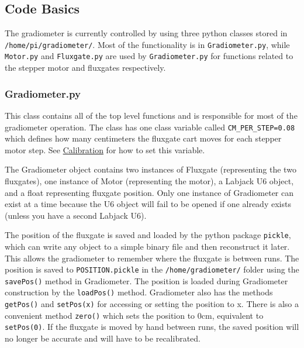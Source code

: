 \documentclass{TheMartianReport}
\newcommand{\pyinline}[1]{\texttt{#1}}
\newcommand{\shellinline}[1]{\texttt{#1}}
\begin{document}
\subsection{Code Basics} \label{subsec:CodeBasics}
The gradiometer is currently controlled by using three python classes stored in \shellinline{/home/pi/gradiometer/}. Most of the functionality is in \shellinline{Gradiometer.py}, while \shellinline{Motor.py} and \shellinline{Fluxgate.py} are used by \shellinline{Gradiometer.py} for functions related to the stepper motor and fluxgates respectively.

\subsubsection{Gradiometer.py}
This class contains all of the top level functions and is responsible for most of the gradiometer operation. The class has one class variable called \pyinline{CM_PER_STEP=0.08} which defines how many centimeters the fluxgate cart moves for each stepper motor step. See \hyperref[subsec:Calibration]{Calibration} for how to set this variable.

The Gradiometer object contains two instances of Fluxgate (representing the two fluxgates), one instance of Motor (representing the motor), a Labjack U6 object, and a float representing fluxgate position.  Only one instance of Gradiometer can exist at a time because the U6 object will fail to be opened if one already exists (unless you have a second Labjack U6).

The position of the fluxgate is saved and loaded by the python package \pyinline{pickle}, which can write any object to a simple binary file and then reconstruct it later. This allows the gradiometer to remember where the fluxgate is between runs. The position is saved to \shellinline{POSITION.pickle} in the \shellinline{/home/gradiometer/} folder using the \pyinline{savePos()} method in Gradiometer. The position is loaded during Gradiometer construction by the \pyinline{loadPos()} method. Gradiometer also has the methods \pyinline{getPos()} and \pyinline{setPos(x)} for accessing or setting the position to x. There is also a convenient method \pyinline{zero()} which sets the position to 0cm, equivalent to \pyinline{setPos(0)}. If the fluxgate is moved by hand between runs, the saved position will no longer be accurate and will have to be recalibrated.
\end{document}
